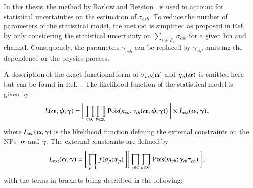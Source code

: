 \begin{itemize}
  In this thesis, the method by Barlow and Beeston~\cite{barlow1993} is used to
  account for statistical uncertainties on the estimation of $\sigma_{csb}$. To
  reduce the number of parameters of the statistical model, the method is
  simplified as proposed in Ref.~\cite{conway2011} by only considering the
  statistical uncertainty on $\sum_{s \in \mathcal{S}_{c}} \sigma_{csb}$ for a
  given bin and channel. Consequently, the parameters $\gamma_{csb}$ can be
  replaced by $\gamma_{cb}$, omitting the dependence on the physics process.

\end{itemize}
A description of the exact functional form of $\sigma_{csb}(\bm{\alpha})$ and
$\eta_{cs}(\bm{\alpha})$ is omitted here but can be found in
Ref.~\cite{cranmer2012}. The likelihood function of the statistical model is
given by
\begin{align}
  L(\bm{\alpha}, \bm{\phi}, \bm{\gamma}) = \Biggl[\,
  \prod_{c \in \mathcal{C}}
  \prod_{b \in \mathcal{B}_{c}}
  \operatorname{Pois}\bigl( n_{cb}; \nu_{cb}(\bm{\alpha}, \bm{\phi}, \bm{\gamma}) \bigr)
  \,\Biggr]
  \times L_{\text{ext}}(\bm{\alpha}, \bm{\gamma}) \,\text{,}
  \label{eq:likelihood_histfactory}
\end{align}
where $L_{\text{ext}}(\bm{\alpha}, \bm{\gamma})$ is the likelihood
function defining the external constraints on the NPs~$\bm{\alpha}$ and
$\bm{\gamma}$. The external constraints are defined by
\begin{align*}
  L_{\text{ext}}(\bm{\alpha}, \bm{\gamma}) =
  \Biggl[\, \prod_{p=1}^{n} f(a_p; \alpha_p)     \,\Biggr]
  \Biggl[\, \prod_{c \in \mathcal{C}} \prod_{b \in \mathcal{B}_{c}} \operatorname{Pois}(m_{cb}; \gamma_{cb} \tau_{cb}) \,\Biggr] \,\text{,}
\end{align*}
with the terms in brackets being described in the following:
